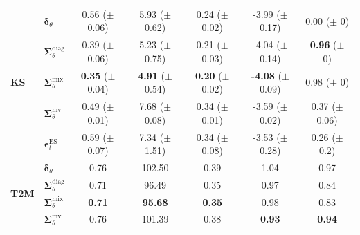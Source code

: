 \begin{tabular}{|l|l|ccccc|}
        \midrule
        \multirow{5}{*}{\textbf{KS}}
        & $\bm\delta_\theta$ & \makecell{0.56 \\ ($\pm$ 0.06)} & \makecell{5.93 \\ ($\pm$ 0.62)} & \makecell{0.24 \\ ($\pm$ 0.02)} & \makecell{-3.99 \\ ($\pm$ 0.17)} & \makecell{0.00 \\ ($\pm$ 0)} \\
        & $\bm\Sigma_\theta^{\mathrm{diag}}$ & \makecell{0.39 \\ ($\pm$ 0.06)} & \makecell{5.23 \\ ($\pm$ 0.75)} & \makecell{0.21 \\ ($\pm$ 0.03)} & \makecell{-4.04 \\ ($\pm$ 0.14)} & \makecell{\textbf{0.96} \\ ($\pm$ 0)} \\
        & $\bm\Sigma_\theta^{\mathrm{mix}}$ & \makecell{\textbf{0.35} \\ ($\pm$ 0.04)} & \makecell{\textbf{4.91} \\ ($\pm$ 0.54)} & \makecell{\textbf{0.20} \\ ($\pm$ 0.02)} & \makecell{\textbf{-4.08} \\ ($\pm$ 0.09)} & \makecell{0.98 \\ ($\pm$ 0)} \\
        & $\bm\Sigma_\theta^{\mathrm{mv}}$ & \makecell{0.49 \\ ($\pm$ 0.01)} & \makecell{7.68 \\ ($\pm$ 0.08)} & \makecell{0.34 \\ ($\pm$ 0.01)} & \makecell{-3.59 \\ ($\pm$ 0.02)} & \makecell{0.37 \\ ($\pm$ 0.06)} \\
        & $\bm\epsilon_t^\mathrm{ES}$ & \makecell{0.59 \\ ($\pm$ 0.07)} & \makecell{7.34 \\ ($\pm$ 1.51)} & \makecell{0.34 \\ ($\pm$ 0.08)} & \makecell{-3.53 \\ ($\pm$ 0.28)} & \makecell{0.26 \\ ($\pm$ 0.2)} \\
        \midrule
        \multirow{4}{*}{\textbf{T2M}}
        & $\bm\delta_\theta$ & 0.76 & 102.50 & 0.39 & 1.04 & 0.97 \\
        & $\bm\Sigma_\theta^{\mathrm{diag}}$ & 0.71 & 96.49 & 0.35 & 0.97 & 0.84 \\
        & $\bm\Sigma_\theta^{\mathrm{mix}}$ & \textbf{0.71} & \textbf{95.68} & \textbf{0.35} & 0.98 & 0.83 \\
        & $\bm\Sigma_\theta^{\mathrm{mv}}$ & 0.76 & 101.39 & 0.38 & \textbf{0.93} & \textbf{0.94} \\
        \bottomrule
    \end{tabular}

